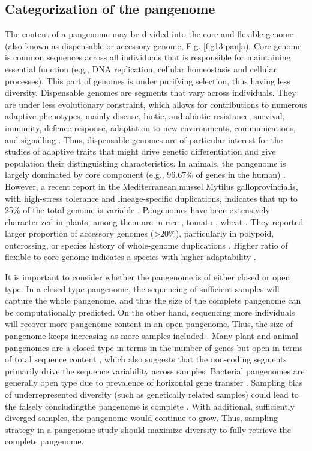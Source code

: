 \documentclass[../main.tex]{subfiles}
\begin{document}
\subsection{Categorization of the pangenome}

The content of a pangenome may be divided into the core and flexible genome (also known  as dispensable or accessory genome, Fig. \ref{fig13:pan}a). Core genome is common sequences across all individuals that is responsible for maintaining essential function (e.g., DNA replication, cellular homeostasis and cellular processes). This part of genomes is under purifying selection, thus having less diversity. Dispensable genomes are segments that vary across individuals. They are under less evolutionary constraint, which allows for contributions to numerous adaptive phenotypes, mainly disease, biotic, and abiotic resistance, survival, immunity, defence response, adaptation to new environments, communications, and signalling \citep{golicz2020pangenomics}. Thus, dispensable genomes are of particular interest for the studies of adaptive traits that might drive genetic differentiation and give population their distinguishing characteristics. In animals, the pangenome is largely dominated by core component (e.g., 96.67\% of genes in the human) \citep{duan2019hupan}. However, a recent report in the Mediterranean mussel Mytilus galloprovincialis, with high-stress tolerance and lineage-specific duplications, indicates that up to 25\% of the total genome is variable \citep{gerdol2020massive}. Pangenomes have been extensively characterized in plants, among them are in rice \citep{zhao2018pan}, tomato \citep{gao2019tomato}, wheat \citep{walkowiak2020multiple}. They reported larger proportion of accessory genomes (>20\%), particularly in polypoid, outcrossing, or species history of whole-genome duplications \citep{tao2019exploring}. Higher ratio of flexible to core genome indicates a species with higher adaptability \citep{tranchant2018plant}. 

It is important to consider whether the pangenome is of either closed or open type. In a closed type pangenome, the sequencing of sufficient samples will capture the whole pangenome, and thus the size of the complete pangenome can be computationally predicted. On the other hand, sequencing more individuals will recover more pangenome content in an open pangenome. Thus, the size of pangenome keeps increasing as more samples included \citep{golicz2020pangenomics}. Many plant and animal pangenomes are a closed type in terms in the number of genes but open in terms of total sequence content \citep{duan2019hupan,golicz2020pangenomics}, which also suggests that the non-coding segments primarily drive the sequence variability across samples. Bacterial pangenomes  are generally open type due to prevalence of horizontal gene transfer \citep{soucy2015horizontal}. Sampling bias of underrepresented diversity (such as genetically related samples) could lead to the falsely concludingthe pangenome is complete \citep{tranchant2018plant}. With additional, sufficiently  diverged samples, the  pangenome would continue to grow. Thus, sampling strategy in a pangenome study should maximize diversity to fully retrieve the complete pangenome. 
\end{document}
